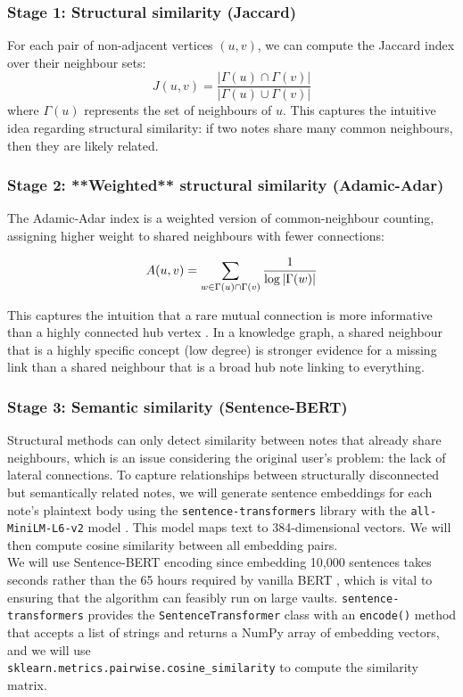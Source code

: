\documentclass[fontsize=11pt]{article}
\begin{document}
\subsubsection*{Stage 1: Structural similarity (Jaccard)}
For each pair of non-adjacent vertices $(u,v)$, we can compute the Jaccard index over their neighbour sets:
$$
J(u,v) = \frac{|\Gamma(u) \cap \Gamma(v)|}{|\Gamma(u) \cup \Gamma(v)|}
$$
where $\Gamma(u)$ represents the set of neighbours of $u$. This captures the intuitive idea regarding structural similarity: if two notes share many common neighbours, then they are likely related.

\subsubsection*{Stage 2: **Weighted** structural similarity (Adamic-Adar)}
The Adamic-Adar index is a weighted version of common-neighbour counting, assigning higher weight to shared neighbours with fewer connections: 

$$
A(u, v) = \sum_{w \in \Gamma(u) \cap \Gamma(v)} \frac{1}{\log |\Gamma(w)|}\\
$$

\noindent This captures the intuition that a rare mutual connection is more informative than a highly connected hub vertex \cite{adamic2003}. In a knowledge graph, a shared neighbour that is a highly specific concept (low degree) is stronger evidence for a missing link than a shared neighbour that is a broad hub note linking to everything.
 

\subsubsection*{Stage 3: Semantic similarity (Sentence-BERT)}
Structural methods can only detect similarity between notes that already share neighbours, which is an issue considering the original user's problem: the lack of lateral connections. To capture relationships between structurally disconnected but semantically related notes, we will generate sentence embeddings for each note's plaintext body using the \texttt{sentence-transformers} library with the \texttt{all-MiniLM-L6-v2} model \cite{reimers2019}. This model maps text to 384-dimensional vectors. We will then compute cosine similarity between all embedding pairs. \\

\noindent We will use Sentence-BERT encoding since embedding 10,000 sentences takes seconds rather than the 65 hours required by vanilla BERT \cite{reimers2019}, which is vital to ensuring that the algorithm can feasibly run on large vaults. \texttt{sentence-transformers} provides the \texttt{SentenceTransformer} class with an \texttt{encode()} method that accepts a list of strings and returns a NumPy array of embedding vectors, and we will use\\ \texttt{sklearn.metrics.pairwise.cosine\_similarity} to compute the similarity matrix.
\end{document}
